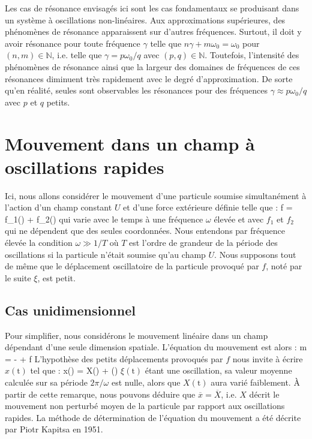 Les cas de r\'{e}sonance envisag\'{e}s ici sont les cas fondamentaux se produisant dans un syst\`{e}me \`{a} oscillations non-lin\'{e}aires. Aux approximations sup\'{e}rieures, des ph\'{e}nom\`{e}nes de r\'{e}sonance apparaissent sur d'autres fr\'{e}quences. Surtout, il doit y avoir r\'{e}sonance pour toute fr\'{e}quence $\gamma$ telle que $n\gamma + m\omega_{0} = \omega_{0}$ pour $(n,m) \in \mathbb{N}$, i.e. telle que $\gamma = p\omega_{0} / q$ avec $(p,q) \in \mathbb{N}$. Toutefois, l'intensit\'{e} des ph\'{e}nom\`{e}nes de r\'{e}sonance ainsi que la largeur des domaines de fr\'{e}quences de ces r\'{e}sonances diminuent tr\`{e}s rapidement avec le degr\'{e} d'approximation. De sorte qu'en r\'{e}alit\'{e}, seules sont observables les r\'{e}sonances pour des fr\'{e}quences $\gamma \approx p\omega_{0} / q$ avec $p$ et $q$ petits.

\section{Mouvement dans un champ \`{a} oscillations rapides}\label{PAR:30}

Ici, nous allons consid\'{e}rer le mouvement d'une particule soumise simultan\'{e}ment \`{a} l'action d'un champ constant $U$ et d'une force ext\'{e}rieure d\'{e}finie telle que :
\be
	f = f_{1}\cos(\omega{}) + f_{2}\sin(\omega{}) \label{EQ:30_1}
\ee
qui varie avec le temps \`{a} une fr\'{e}quence $\omega$ \'{e}lev\'{e}e et avec $f_{1}$ et $f_{2}$ qui ne d\'{e}pendent que des seules coordonn\'{e}es. Nous entendons par fr\'{e}quence \'{e}lev\'{e}e la condition $\omega \gg 1/T$ o\`{u} $T$ est l'ordre de grandeur de la p\'{e}riode des oscillations si la particule n'\'{e}tait soumise qu'au champ $U$. Nous supposons tout de m\^{e}me que le d\'{e}placement oscillatoire de la particule provoqu\'{e} par $f$, not\'{e} par le suite $\xi$, est petit.

\subsection{Cas unidimensionnel}

Pour simplifier, nous consid\'{e}rons le mouvement lin\'{e}aire dans un champ d\'{e}pendant d'une seule dimension spatiale. L'\'{e}quation du mouvement est alors :
\be
	m = - + f \label{EQ:30_2}
\ee
L'hypoth\`{e}se des petits d\'{e}placements provoqu\'{e}s par $f$ nous invite \`{a} \'{e}crire $x(\mathrm{t})$ tel que :
\be
	x() = X() + \xi() \label{EQ:30_3}
\ee
$\xi(\mathrm{t})$ \'{e}tant une oscillation, sa valeur moyenne calcul\'{e}e sur sa p\'{e}riode $2\pi/\omega$ est nulle, alors que $X(\mathrm{t})$ aura vari\'{e} faiblement. \`{A} partir de cette remarque, nous pouvons d\'{e}duire que $\overline{x} = \overline{X}$, i.e. $X$ d\'{e}crit le mouvement non perturb\'{e} moyen de la particule par rapport aux oscillations rapides. La m\'{e}thode de d\'{e}termination de l'\'{e}quation du mouvement a \'{e}t\'{e} d\'{e}crite par Piotr Kapitsa en 1951.

